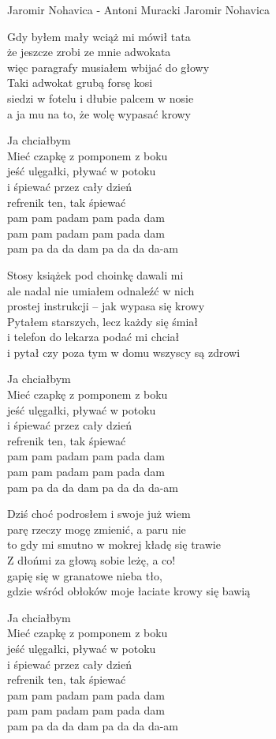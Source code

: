 {Jaromir Nohavica - Antoni Muracki}
{Jaromir Nohavica}
\begin{text}
Gdy byłem mały wciąż mi mówił tata\\
że jeszcze zrobi ze mnie adwokata\\
więc paragrafy musiałem wbijać do głowy\\
Taki adwokat grubą forsę kosi\\
siedzi w fotelu i dłubie palcem w nosie\\
a ja mu na to, że wolę wypasać krowy

Ja chciałbym\\
Mieć czapkę z pomponem z boku\\
jeść ulęgałki, pływać w potoku\\
i śpiewać przez cały dzień\\
refrenik ten, tak śpiewać\\
pam pam padam pam pada dam\\
pam pam padam pam pada dam\\
pam pa da da dam pa da da da-am

Stosy książek pod choinkę dawali mi\\
ale nadal nie umiałem odnaleźć w nich\\
prostej instrukcji – jak wypasa się krowy\\
Pytałem starszych, lecz każdy się śmiał\\
i telefon do lekarza podać mi chciał\\
i pytał czy poza tym w domu wszyscy są zdrowi

Ja chciałbym\\
Mieć czapkę z pomponem z boku\\
jeść ulęgałki, pływać w potoku\\
i śpiewać przez cały dzień\\
refrenik ten, tak śpiewać\\
pam pam padam pam pada dam\\
pam pam padam pam pada dam\\
pam pa da da dam pa da da da-am

Dziś choć podrosłem i swoje już wiem\\
parę rzeczy mogę zmienić, a paru nie\\
to gdy mi smutno w mokrej kładę się trawie\\
Z dłońmi za głową sobie leżę, a co!\\
gapię się w granatowe nieba tło,\\
gdzie wśród obłoków moje łaciate krowy się bawią

Ja chciałbym\\
Mieć czapkę z pomponem z boku\\
jeść ulęgałki, pływać w potoku\\
i śpiewać przez cały dzień\\
refrenik ten, tak śpiewać\\
pam pam padam pam pada dam\\
pam pam padam pam pada dam\\
pam pa da da dam pa da da da-am
\end{text}
\begin{chord}
\end{chord}
